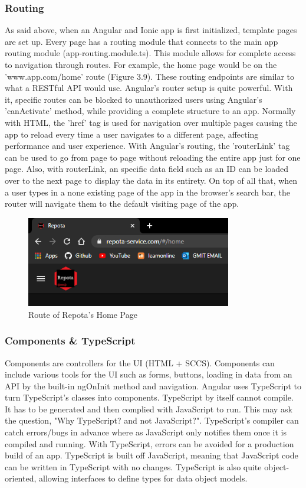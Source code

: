 \subsubsection{Routing}
As said above, when an Angular and Ionic app is first initialized, template pages are set up. Every page has a routing module that connects to the main app routing module (app-routing.module.ts). This module allows for complete access to navigation through routes. For example, the home page would be on the 'www.app.com/home' route (Figure 3.9). These routing endpoints are similar to what a RESTful API would use. Angular's router setup is quite powerful. With it, specific routes can be blocked to unauthorized users using Angular's 'canActivate' method, while providing a complete structure to an app. Normally with HTML, the 'href' tag is used for navigation over multiple pages causing the app to reload every time a user navigates to a different page, affecting performance and user experience. With Angular's routing, the 'routerLink' tag can be used to go from page to page without reloading the entire app just for one page. Also, with routerLink, an specific data field such as an ID can be loaded over to the next page to display the data in its entirety. On top of all that, when a user types in a none existing page of the app in the browser's search bar, the router will navigate them to the default visiting page of the app. \cite{ref15}

\begin{figure}[H]
    \caption{Route of Repota's Home Page}
    \label{image:homeRoute}
    \centering
    \includegraphics[width=0.8\textwidth]{images/misc/home-route.png}
\end{figure}

\subsubsection{Components \& TypeScript}
Components are controllers for the UI (HTML + SCCS). Components can include various tools for the UI such as forms, buttons, loading in data from an API by the built-in ngOnInit method and navigation. Angular uses TypeScript to turn TypeScript's classes into components. TypeScript by itself cannot compile. It has to be generated and then complied with JavaScript to run. This may ask the question, "Why TypeScript? and not JavaScript?". TypeScript's compiler can catch errors/bugs in advance where as JavaScript only notifies them once it is compiled and running. With TypeScript, errors can be avoided for a production build of an app. TypeScript is built off JavaScript, meaning that JavaScript code can be written in TypeScript with no changes. TypeScript is also quite object-oriented, allowing interfaces to define types for data object models. \cite{ref16}

